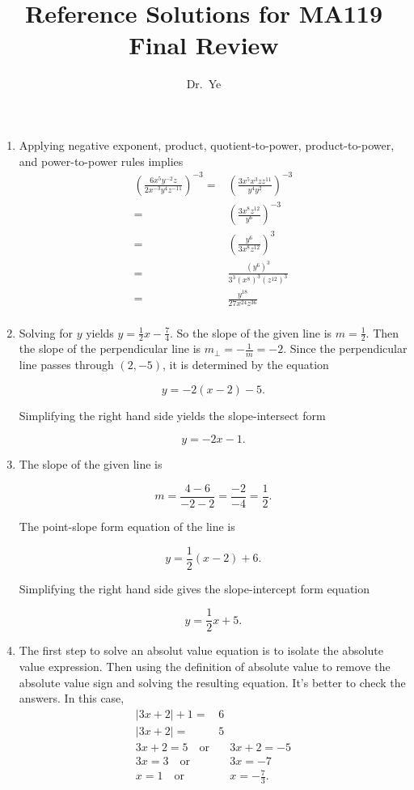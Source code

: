 \documentclass[
  12pt]{article}
\title{Reference Solutions for MA119 Final Review}
\author{Dr.~Ye}
\date{}
\begin{document}
\maketitle
\ifdefined\Shaded\renewenvironment{Shaded}{\begin{tcolorbox}[boxrule=0pt, interior hidden, breakable, enhanced, sharp corners, borderline west={3pt}{0pt}{shadecolor}, frame hidden]}{\end{tcolorbox}}\fi

\begin{enumerate}
\def\labelenumi{\arabic{enumi}.}
\item
  Applying negative exponent, product, quotient-to-power,
  product-to-power, and power-to-power rules implies \[
   \begin{aligned}
   \left(\frac{6x^5y^{-2}z}{2x^{-3}y^4z^{-11}}\right)^{-3}=&\left(\frac{3x^5x^3zz^{11}}{y^4y^2}\right)^{-3}\\
   =&\left(\frac{3x^8z^{12}}{y^6}\right)^{-3}\\
   =&\left(\frac{y^6}{3x^8z^{12}}\right)^3\\
   =&\frac{(y^6)^3}{3^3(x^8)^3(z^{12})^3}\\
   =&\frac{y^{18}}{27x^{24}z^{36}}\\
   \end{aligned}
   \]
\item
  Solving for \(y\) yields \(y=\frac12x-\frac74\). So the slope of the
  given line is \(m=\frac12\). Then the slope of the perpendicular line
  is \(m_\perp=-\frac1m=-2\). Since the perpendicular line passes
  through \((2,-5)\), it is determined by the equation

  \[y=-2(x-2)-5.\]

  Simplifying the right hand side yields the slope-intersect form

  \[y=-2x-1.\]
\item
  The slope of the given line is

  \[m=\frac{4-6}{-2-2}=\frac{-2}{-4}=\frac12.\]

  The point-slope form equation of the line is

  \[y=\frac12(x-2)+6.\]

  Simplifying the right hand side gives the slope-intercept form
  equation

  \[y=\frac12x+5.\]
\item
  The first step to solve an absolut value equation is to isolate the
  absolute value expression. Then using the definition of absolute value
  to remove the absolute value sign and solving the resulting equation.
  It's better to check the answers. In this case, \[
   \begin{aligned}
   |3x+2|+1=&6\\
   |3x+2|=&5\\
   3x+2=5\quad\text{or}&\quad 3x+2=-5\\
   3x=3\quad\text{or}&\quad 3x=-7\\
   x=1\quad\text{or}&\quad x=-\frac73.
   \end{aligned}
   \]


\end{enumerate}
\end{document}

